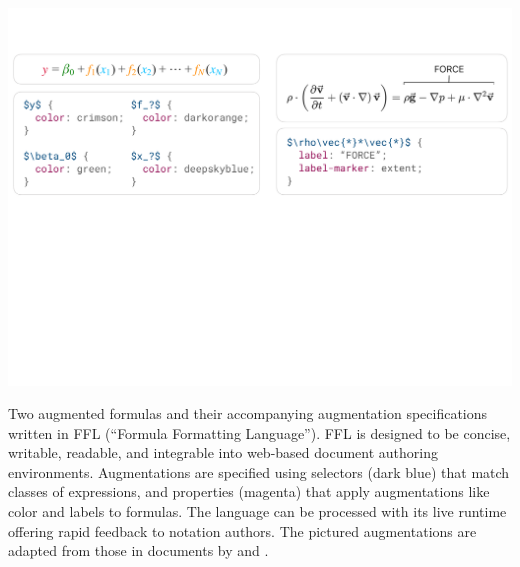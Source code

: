\documentclass[sigconf]{acmart}
\begin{document}


\begin{teaserfigure}
  \vspace{-1ex}
  \includegraphics[width=\textwidth]{figures/teaser}
  \vspace{-5ex}
  \caption{Two augmented formulas and their accompanying augmentation specifications written in FFL (``Formula Formatting Language''). \normalfont FFL is designed to be concise, writable, readable, and integrable into web-based document authoring environments. Augmentations are specified using selectors (\textcolor{teasercyan}{dark blue}) that match classes of expressions, and properties (\textcolor{teasermagenta}{magenta}) that apply augmentations like color and labels to formulas. The language can be processed with its live runtime offering rapid feedback to notation authors. The pictured augmentations are adapted from those in documents by \citet{ref:hohman2019gamut} and \citet{ref:murad2020navierstokes}.}
  \vspace{2ex}
  \label{fig:teaser}
\end{teaserfigure}
\end{document}
